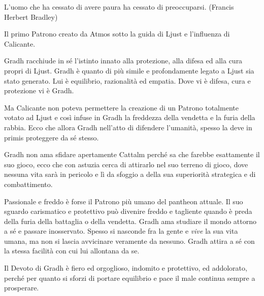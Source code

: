 \begin{multicols}{2}
\begin{changemargin}{0.3cm}{0.3cm}\begin{enfasi}
L'uomo che ha cessato di avere paura ha cessato di preoccuparsi. (Francis Herbert Bradley)
\end{enfasi}\end{changemargin}\medskip


Il primo Patrono creato da Atmos sotto la guida di Ljust e l'influenza di Calicante.

Gradh racchiude in sé l'istinto innato alla protezione, alla difesa ed alla cura propri di Ljust. Gradh è quanto di più simile e profondamente legato a Ljust sia stato generato. Lui è equilibrio, razionalità ed empatia.
Dove vi è difesa, cura e protezione vi è Gradh.

Ma Calicante non poteva permettere la creazione di un Patrono totalmente votato ad Ljust e così infuse in Gradh la freddezza della vendetta e la furia della rabbia. Ecco che allora Gradh nell'atto di difendere l'umanità, spesso la deve in primis proteggere da sé stesso.

Gradh non ama sfidare apertamente Cattalm perché sa che farebbe esattamente il suo gioco, ecco che con astuzia cerca di attirarlo nel suo terreno di gioco, dove nessuna vita sarà in pericolo e lì da sfoggio a della sua superiorità strategica e di combattimento.

Passionale e freddo è forse il Patrono più umano del pantheon attuale. Il suo sguardo carismatico e protettivo può divenire freddo e tagliente quando è preda della furia della battaglia o della vendetta. Gradh ama studiare il mondo attorno a sé e passare inosservato. Spesso si nasconde fra la gente e \emph{vive} la sua vita umana, ma non si lascia avvicinare veramente da nessuno. Gradh attira a sé con la stessa facilità con cui lui allontana da se.

Il Devoto di Gradh è fiero ed orgoglioso, indomito e protettivo, ed addolorato, perché per quanto si sforzi di portare equilibrio e pace il male continua sempre a prosperare.


\end{multicols}
